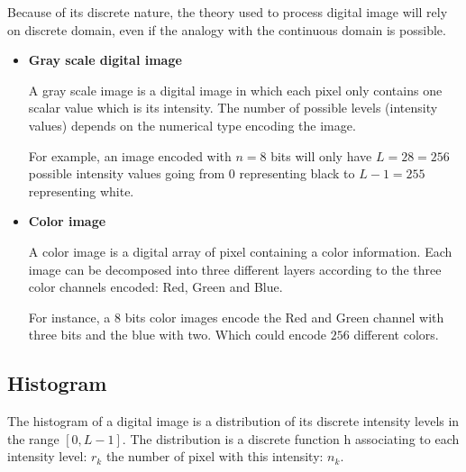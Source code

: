 \documentclass[12pt]{article}
\begin{document}
	Because of its discrete nature, the theory used to process digital image will rely on discrete domain, even if the analogy with the continuous domain is possible.
	
	\begin{itemize}
		\item \textbf{Gray scale digital image}
		
		A gray scale image is a digital image in which each pixel only contains one scalar value which is its intensity. The number of possible levels (intensity values) depends on the numerical type encoding the image.
		
		For example, an image encoded with $n=8$ bits will only have $L=28=256$ possible intensity values going from 0 representing black to $L-1=255$ representing white.
		
		\item \textbf{Color image}
		
		A color image is a digital array of pixel containing a color information. Each image can be decomposed into three different layers according to the three color channels encoded: Red, Green and Blue.
		
		For instance, a $8$ bits color images encode the Red and Green channel with three bits and the blue with two. Which could encode $256$ different colors.
	\end{itemize}

	\subsection{Histogram}
	The histogram of a digital image is a distribution of its discrete intensity levels in the range $[0, L-1]$. The distribution is a discrete function h associating to each intensity level: $r_k$ the number of pixel with this intensity: $n_k$.
	
\end{document}
